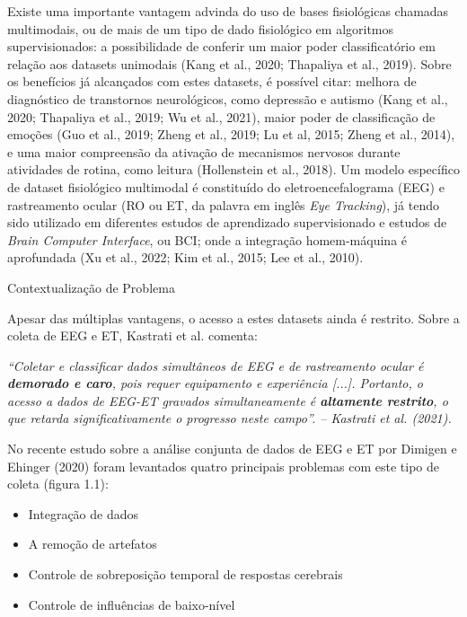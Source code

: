 \documentclass[a4paper, 12pt]{ppgeb}
\makeatletter
\renewcommand{\section}{\@startsection
{section}
{1}
{0mm}
{-\baselineskip}
{0.5\baselineskip}
{\large\bfseries\scshape}}
\makeatother
\begin{document}
Existe uma importante vantagem advinda do uso de bases fisiológicas chamadas multimodais, 
ou de mais de um tipo de dado fisiológico em algoritmos supervisionados: a possibilidade de conferir 
um maior poder classificatório em relação aos datasets unimodais (Kang et al., 2020; Thapaliya et al., 2019). 
Sobre os benefícios já alcançados com estes datasets, é possível citar: melhora de diagnóstico de transtornos 
neurológicos, como depressão e autismo (Kang et al., 2020; Thapaliya et al., 2019; Wu et al., 2021), 
maior poder de classificação de emoções (Guo et al., 2019; Zheng et al., 2019;  Lu et al, 2015; Zheng et al., 2014), 
e uma maior compreensão da ativação de mecanismos nervosos durante atividades de rotina, como leitura (Hollenstein et al., 2018). 
Um modelo específico de dataset fisiológico multimodal é constituído do eletroencefalograma (EEG) e
 rastreamento ocular (RO ou ET, da palavra em inglês \textit{Eye Tracking}), já tendo sido utilizado em diferentes estudos
 de aprendizado supervisionado e estudos de \textit{Brain Computer Interface}, ou BCI; onde a integração homem-máquina é aprofundada
 (Xu et al., 2022; Kim et al., 2015; Lee et al., 2010).


\section{Contextualização de Problema}

Apesar das múltiplas vantagens, o acesso a estes datasets ainda é restrito. Sobre a coleta de EEG e ET, 
Kastrati et al. comenta:

\textit{“Coletar e classificar dados simultâneos de EEG e de rastreamento ocular é \textbf{demorado e caro},
 pois requer equipamento e experiência [...]. 
 Portanto, o acesso a dados de EEG-ET gravados simultaneamente é \textbf{altamente restrito}, o que retarda significativamente o progresso neste campo”. – Kastrati et al. (2021).}

No recente estudo sobre a análise conjunta de dados de EEG e ET por Dimigen e Ehinger (2020) foram levantados
 quatro principais problemas com este tipo de coleta (figura 1.1):


\begin{itemize}
    \item Integração de dados
    \item A remoção de artefatos
    \item Controle de sobreposição temporal de respostas cerebrais
    \item Controle de influências de baixo-nível
\end{itemize}
\end{document}
